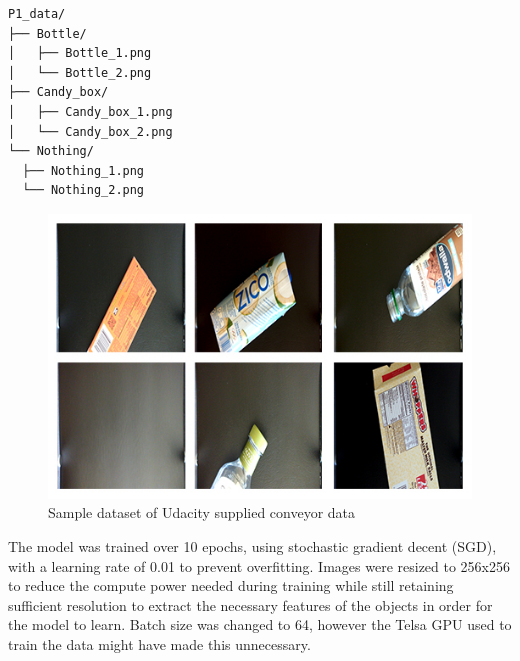 \documentclass[10pt,journal,compsoc]{IEEEtran}
\begin{document}
\begin{verbatim}
P1_data/
├── Bottle/
│   ├── Bottle_1.png
│   └── Bottle_2.png
├── Candy_box/
│   ├── Candy_box_1.png
│   └── Candy_box_2.png
└── Nothing/
  ├── Nothing_1.png
  └── Nothing_2.png
\end{verbatim}

\begin{figure}[thpb]
  \centering
  \includegraphics[width=\linewidth]{../img/P1-Dataset/dataset_sample.jpg}
  \caption{Sample dataset of Udacity supplied conveyor data}
  \label{p1Data}
\end{figure}

The model was trained over 10 epochs, using stochastic gradient decent (SGD), with a learning rate of 0.01 to prevent overfitting. Images were resized to 256x256 to reduce the compute power needed during training while still retaining sufficient resolution to extract the necessary features of the objects in order for the model to learn. Batch size was changed to 64, however the Telsa GPU used to train the data might have made this unnecessary.
\end{document}
